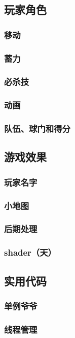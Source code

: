 \documentclass[conference]{IEEEtran}
\begin{document}
\subsection{玩家角色}
\subsubsection{移动}
\subsubsection{蓄力}
\subsubsection{必杀技}
\subsubsection{动画}
\subsubsection{队伍、球门和得分}


\subsection{游戏效果}
\subsubsection{玩家名字}
\subsubsection{小地图}
\subsubsection{后期处理}
\subsubsection{shader（天）}


\subsection{实用代码}
\subsubsection{单例爷爷}
\subsubsection{线程管理}
\end{document}
